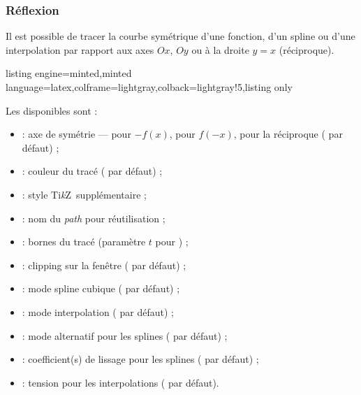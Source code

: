 \documentclass[11pt,a4paper]{ltxdoc}
\providecommand\tikzlogo{Ti\textit{k}Z}
\let\TikZ\tikzlogo
\begin{document}
\subsubsection{Réflexion}\label{transformfreflex}

Il est possible de tracer la courbe symétrique d'une fonction, d'un spline ou d'une interpolation par rapport aux axes $Ox$, $Oy$ ou à la droite $y=x$ (réciproque).

\begin{tcblisting}{listing engine=minted,minted language=latex,colframe=lightgray,colback=lightgray!5,listing only}
\end{tcblisting}

Les  disponibles sont :

\begin{itemize}
  \item {} : axe de symétrie ---  pour $-f(x)$,  pour $f(-x)$,  pour la réciproque ( par défaut) ;
  \item {} : couleur du tracé ( par défaut) ;
  \item {} : style \TikZ\ supplémentaire ;
  \item {} : nom du \textit{path} pour réutilisation ;
  \item {} : bornes du tracé (paramètre $t$ pour ) ;
  \item {} : clipping sur la fenêtre ( par défaut) ;
  \item {} : mode spline cubique ( par défaut) ;
  \item {} : mode interpolation ( par défaut) ;
  \item {} : mode alternatif pour les splines ( par défaut) ;
  \item {} : coefficient(s) de lissage pour les splines ( par défaut) ;
  \item {} : tension pour les interpolations ( par défaut).
\end{itemize}
\end{document}

